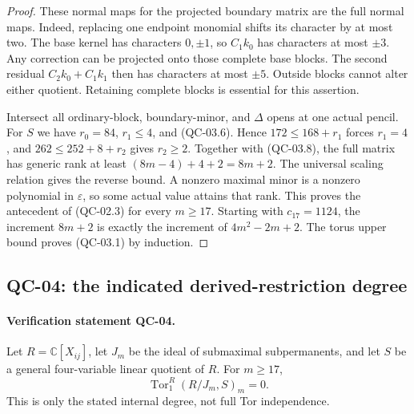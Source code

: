 \begin{proof}
These normal maps for the projected boundary matrix are the full
normal maps. Indeed, replacing one endpoint monomial shifts its
character by at most two. The base kernel has characters $0,\pm1$,
so $C_1k_0$ has characters at most $\pm3$. Any correction can
be projected onto those complete base blocks. The second residual
$C_2k_0+C_1k_1$ then has characters at most $\pm5$.
Outside blocks cannot alter either quotient. Retaining complete
blocks is essential for this assertion.

Intersect all ordinary-block, boundary-minor, and $\Delta$ opens
at one actual pencil. For $S$ we have $r_0=84$, $r_1\leq4$,
and (QC-03.6). Hence $172\leq168+r_1$ forces $r_1=4$, and
$262\leq252+8+r_2$ gives $r_2\geq2$. Together with (QC-03.8),
the full matrix has generic rank at least $(8m-4)+4+2=8m+2$.
The universal scaling relation gives the reverse bound.
A nonzero maximal minor is a nonzero polynomial in $\varepsilon$,
so some actual value attains that rank. This proves the antecedent
of (QC-02.3) for every $m\geq17$. Starting with $c_{17}=1124$,
the increment $8m+2$ is exactly the increment of $4m^2-2m+2$.
The torus upper bound proves (QC-03.1) by induction.
\end{proof}

\subsection{QC-04: the indicated derived-restriction degree}

\paragraph{Verification statement QC-04.}
Let $R=\mathbb C[X_{ij}]$, let $J_m$ be the ideal of submaximal
subpermanents, and let $S$ be a general four-variable linear
quotient of $R$. For $m\geq17$,
\[
 \operatorname{Tor}_1^R(R/J_m,S)_m=0.
\]
This is only the stated internal degree, not full Tor independence.

